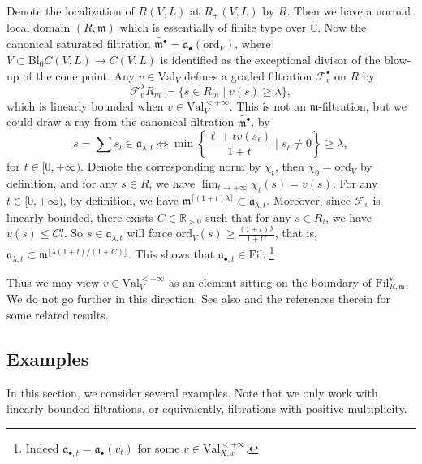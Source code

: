 \documentclass[11pt, leqno]{amsart}%
\theoremstyle{plain}
\theoremstyle{definition}
\theoremstyle{remark}
\newcommand{\cF}{\mathcal{F}}
\newcommand{\bC}{\mathbb{C}}
\newcommand{\bR}{\mathbb{R}}
\newcommand{\bT}{\mathbb{T}}
\newcommand{\fa}{\mathfrak{a}}
\newcommand{\fm}{\mathfrak{m}}
\newcommand{\ord}{\mathrm{ord}}
\newcommand{\Val}{\mathrm{Val}}
\newcommand{\Bl}{\mathrm{Bl}}
\newcommand{\Fil}{\mathrm{Fil}}
\numberwithin{equation}{section}
\begin{document}
Denote the localization of $R(V,L)$ at $R_+(V,L)$ by $R$. Then we have a normal local domain $(R,\fm)$ which is essentially of finite type over $\bC$. Now the canonical saturated filtration $\widetilde{\fm^\bullet}=\fa_\bullet(\ord_V)$, where $V\subset \Bl_0 C(V,L)\to C(V,L)$ is identified as the exceptional divisor of the blow-up of the cone point. Any $v\in\Val_V$ defines a graded filtration $\cF^\bullet_v$ on $R$ by 
\[
\cF^\lambda_vR_m\coloneqq\{s\in R_m\mid v(s)\ge \lambda\},
\]
which is linearly bounded when $v\in\Val^{<+\infty}_V$. This is not an $\fm$-filtration, but we could draw a ray from the canonical filtration $\widetilde{\fm^\bullet}$, by 
\[
s=\sum s_l\in\fa_{\lambda,t}\Leftrightarrow \min\left\{\frac{\ell+tv(s_\ell)}{1+t}\mid s_\ell\ne 0\right\}\ge \lambda,
\]
for $t\in[0,+\infty)$. Denote the corresponding norm by $\chi_t$, then $\chi_0=\ord_V$ by definition, and for any $s\in R$, we have $\lim_{t\to +\infty}\chi_t(s)=v(s)$. For any $t\in[0,+\infty)$, by definition, we have $\fm^{\lceil(1+t)\lambda\rceil}\subset\fa_{\lambda,t}$. Moreover, since $\cF_v$ is linearly bounded, there exists $C\in\bR_{>0}$ such that for any $s\in R_l$, we have $v(s)\le Cl$. So $s\in\fa_{\lambda,t}$ will force $\ord_V(s)\ge \frac{(1+t)\lambda}{1+C}$, that is, $\fa_{\lambda,t}\subset \fm^{\lfloor \lambda(1+t)/(1+C)\rfloor}$. This shows that $\fa_{\bullet,t}\in\Fil$. \footnote{Indeed $\fa_{\bullet,t}=\fa_\bullet(v_t)$ for some $v\in\Val^{<+\infty}_{X,x}$.} 

Thus we may view $v\in\Val^{<+\infty}_V$ as an element sitting on the boundary of $\Fil^s_{R,\fm}$. %
We do not go further in this direction. See also \cite{Fin23} and the references therein for some related results.












\subsection{Examples}

In this section, we consider several examples. Note that we only work with linearly bounded filtrations, or equivalently, filtrations with positive multiplicity.
\end{document}
